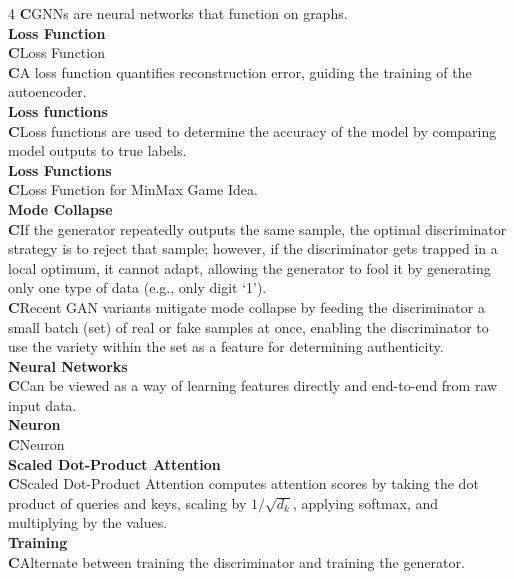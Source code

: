 \documentclass[8pt]{extarticle}
\newcommand{\ctag}{\textcolor{conceptcolor}{\tiny\textbf{C}}\;}
\begin{document}
\begin{multicols}{4}
\ctag GNNs are neural networks that function on graphs.\\
\vspace{2pt}\textbf{Loss Function}\\
\ctag Loss Function\\
\ctag A loss function quantifies reconstruction error, guiding the training of the autoencoder.\\
\vspace{2pt}\textbf{Loss functions}\\
\ctag Loss functions are used to determine the accuracy of the model by comparing model outputs to true labels.\\
\vspace{2pt}\textbf{Loss Functions}\\
\ctag Loss Function for MinMax Game Idea.\\
\vspace{2pt}\textbf{Mode Collapse}\\
\ctag If the generator repeatedly outputs the same sample, the optimal discriminator strategy is to reject that sample; however, if the discriminator gets trapped in a local optimum, it cannot adapt, allowing the generator to fool it by generating only one type of data (e.g., only digit `1').\\
\ctag Recent GAN variants mitigate mode collapse by feeding the discriminator a small batch (set) of real or fake samples at once, enabling the discriminator to use the variety within the set as a feature for determining authenticity.\\
\vspace{2pt}\textbf{Neural Networks}\\
\ctag Can be viewed as a way of learning features directly and end-to-end from raw input data.\\
\vspace{2pt}\textbf{Neuron}\\
\ctag Neuron\\
\vspace{2pt}\textbf{Scaled Dot-Product Attention}\\
\ctag Scaled Dot-Product Attention computes attention scores by taking the dot product of queries and keys, scaling by $1/\sqrt{d_k}$, applying softmax, and multiplying by the values.\\
\vspace{2pt}\textbf{Training}\\
\ctag Alternate between training the discriminator and training the generator.\\

\end{multicols}
\end{document}

